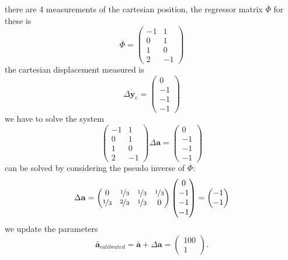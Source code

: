 \documentclass[10pt, a4paper]{report}
\begin{document}
there are 4 measurements of the cartesian position,
the regressor matrix $\overline\Phi$ for these is\begin{equation}
    \overline\Phi=\begin{pmatrix}
        -1&1\\ 
        0&1\\ 
        1&0\\ 
        2&-1
    \end{pmatrix}
\end{equation} 
the cartesian displacement measured is\begin{equation}
    \overline{\Delta \mathbf y_e}=\begin{pmatrix}
        0\\-1\\-1\\-1
    \end{pmatrix}
\end{equation}
we have to solve the system\begin{equation}
    \begin{pmatrix}
        -1&1\\ 
        0&1\\ 
        1&0\\ 
        2&-1
    \end{pmatrix}\Delta\mathbf a = \begin{pmatrix}
        0\\-1\\-1\\-1
    \end{pmatrix}
\end{equation}
can be solved by considering the pseudo inverse of $\overline\Phi$:\begin{equation}
    \Delta\mathbf a = \begin{pmatrix}
        0&\nicefrac{1}{3}&\nicefrac{1}{3}&\nicefrac{1}{3}\\ 
        \nicefrac{1}{3}&\nicefrac{2}{3}&\nicefrac{1}{3}&0
    \end{pmatrix}\begin{pmatrix}
        0\\-1\\-1\\-1
    \end{pmatrix}=\begin{pmatrix}
        -1\\-1
    \end{pmatrix}
\end{equation}
we update the parameters\begin{equation}
    \bar{\mathbf a}_{calibrated}=\bar {\mathbf a} + \Delta \mathbf a = \begin{pmatrix}
        100\\1
    \end{pmatrix}.
\end{equation}
\end{document}
